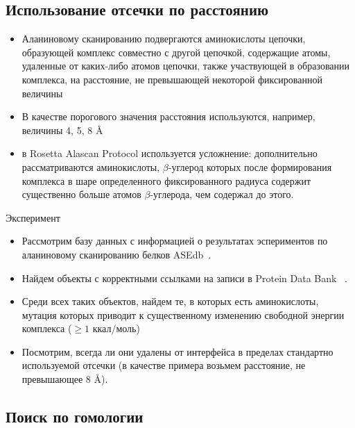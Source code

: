 \subsection{Использование отсечки по расстоянию}

\begin{itemize}
\item Аланиновому сканированию подвергаются аминокислоты цепочки, образующей комплекс совместно с другой цепочкой, содержащие атомы, удаленные от каких-либо атомов цепочки, также участвующей в образовании комплекса, на расстояние, не превышающей некоторой фиксированной величины

\item В качестве порогового значения расстояния используются, например, величины 4, 5, 8 \AA{}

\item в Rosetta Alascan Protocol используется усложнение: дополнительно рассматриваются аминокислоты, $\beta$-углерод которых после формирования комплекса в шаре определенного фиксированного радиуса содержит существенно больше атомов $\beta$-углерода, чем содержал до этого.
\end{itemize}
Эксперимент
\begin{itemize}
\item Рассмотрим базу данных с информацией о результатах эспериментов по аланиновому сканированию белков ASEdb~\cite{asedb2001}.
\item Найдем объекты с корректными ссылками на записи в Protein Data Bank ~\cite{rcsb}.
\item Среди всех таких объектов, найдем те, в которых есть аминокислоты, мутация которых приводит к существенному изменению свободной энергии комплекса ($\geq 1$ ккал/моль)
\item Посмотрим, всегда ли они удалены от интерфейса в пределах стандартно используемой отсечки (в качестве примера возьмем расстояние, не превышающее 8 \AA{}).
\end{itemize}


\subsection{Поиск по гомологии}

